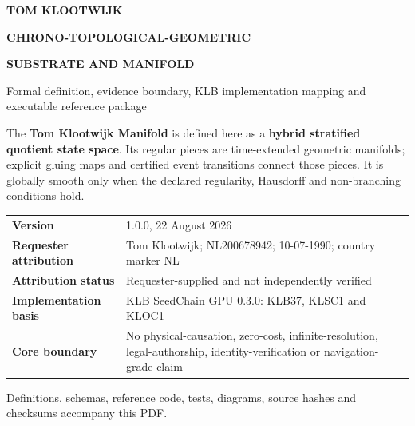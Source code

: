\documentclass[10pt,a4paper]{article}
\begin{document}
\hypersetup{pageanchor=false}
\begin{titlepage}
  \pagecolor{TKnavy}\color{white}
  \vspace*{14mm}
  {\sffamily\bfseries\fontsize{29}{34}\selectfont TOM KLOOTWIJK\par}
  \vspace{4mm}
  {\sffamily\bfseries\fontsize{25}{30}\selectfont CHRONO-TOPOLOGICAL-GEOMETRIC\par}
  {\sffamily\bfseries\fontsize{25}{30}\selectfont SUBSTRATE AND MANIFOLD\par}
  \vspace{8mm}
  {\sffamily\fontsize{15}{19}\selectfont Formal definition, evidence boundary, KLB implementation mapping and executable reference package\par}

  \vfill

  \begin{tcolorbox}[colback=white!8!TKnavy,colframe=TKteal,coltext=white,title=FORMAL CLASS]
  The \textbf{Tom Klootwijk Manifold} is defined here as a \textbf{hybrid stratified quotient state space}. Its regular pieces are time-extended geometric manifolds; explicit gluing maps and certified event transitions connect those pieces. It is globally smooth only when the declared regularity, Hausdorff and non-branching conditions hold.
  \end{tcolorbox}

  \vspace{4mm}
  \begin{tabularx}{\textwidth}{@{}L{42mm}Y@{}}
    \textbf{Version} & 1.0.0, 22 August 2026 \\
    \textbf{Requester attribution} & Tom Klootwijk; NL200678942; 10-07-1990; country marker NL \\
    \textbf{Attribution status} & Requester-supplied and not independently verified \\
    \textbf{Implementation basis} & KLB SeedChain GPU 0.3.0: KLB37, KLSC1 and KLOC1 \\
    \textbf{Core boundary} & No physical-causation, zero-cost, infinite-resolution, legal-authorship, identity-verification or navigation-grade claim \\
  \end{tabularx}

  \vfill
  {\sffamily\small Definitions, schemas, reference code, tests, diagrams, source hashes and checksums accompany this PDF.\par}
\end{titlepage}
\hypersetup{pageanchor=true}
\nopagecolor\color{black}
\end{document}
